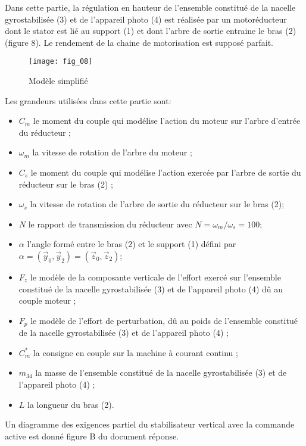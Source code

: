 Dans cette partie, la régulation en hauteur de l'ensemble constitué de la nacelle gyrostabilisée (3) et de l'appareil photo (4) est réalisée par un motoréducteur dont le stator est lié au support (1) et dont l'arbre de sortie entraine le bras (2) (figure 8). Le rendement de la chaine de motorisation est supposé parfait.

\begin{figure}[H]
\centering
\texttt{[image: fig\_08]}
\caption{\label{fig:08} Modèle simplifié}
\end{figure}

 Les grandeurs utilisées dans cette partie sont:

\begin{itemize}
  \item $C_{m}$ le moment du couple qui modélise l'action du moteur sur l'arbre d'entrée du réducteur ;
  \item $\omega_{m}$ la vitesse de rotation de l'arbre du moteur ;
  \item $C_{s}$ le moment du couple qui modélise l'action exercée par l'arbre de sortie du réducteur sur le bras (2) ;
  \item $\omega_{s}$ la vitesse de rotation de l'arbre de sortie du réducteur sur le bras (2);
  \item $N$ le rapport de transmission du réducteur avec $N=\omega_{m} / \omega_{s}=100$;
  \item $\alpha$ l'angle formé entre le bras (2) et le support (1) défini par $\alpha=\left(\vec{y}_{0}, \vec{y}_{2}\right)=\left(\vec{z}_{0}, \vec{z}_{2}\right)$;
  \item $F_{z}$ le modèle de la composante verticale de l'effort exercé sur l'ensemble constitué de la nacelle gyrostabilisée (3) et de l'appareil photo (4) dû au couple moteur ;
  \item $F_{p}$ le modèle de l'effort de perturbation, dû au poids de l'ensemble constitué de la nacelle gyrostabilisée (3) et de l'appareil photo (4) ;
  \item $C_{m}^{*}$ la consigne en couple sur la machine à courant continu ;
  \item $m_{34}$ la masse de l'ensemble constitué de la nacelle gyrostabilisée (3) et de l'appareil photo (4) ;
  \item $L$ la longueur du bras (2).
\end{itemize}

Un diagramme des exigences partiel du stabilisateur vertical avec la commande active est donné figure B du document réponse.


